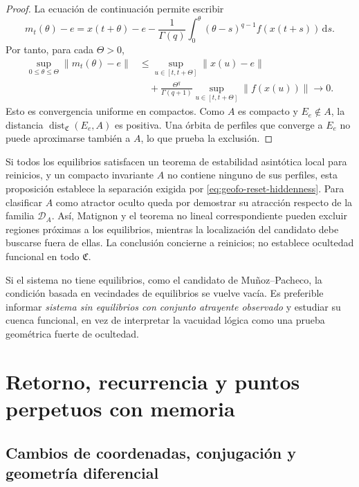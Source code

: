 \begin{proof}
La ecuación de continuación permite escribir
\[
 m_t(\theta)-e=x(t+\theta)-e
 -\frac1{\Gamma(q)}\int_0^\theta
   (\theta-s)^{q-1}f(x(t+s))\,\mathrm ds.
\]
Por tanto, para cada \(\Theta>0\),
\begin{align*}
 \sup_{0\leq\theta\leq\Theta}\|m_t(\theta)-e\|
 &\leq\sup_{u\in[t,t+\Theta]}\|x(u)-e\|\\
 &\quad+\frac{\Theta^q}{\Gamma(q+1)}
       \sup_{u\in[t,t+\Theta]}\|f(x(u))\|
 \longrightarrow0.
\end{align*}
Esto es convergencia uniforme en compactos. Como \(A\) es compacto y
\(E_e\notin A\), la distancia
\(\operatorname{dist}_{\mathfrak C}(E_e,A)\) es positiva.
Una órbita de perfiles que converge a \(E_e\) no puede aproximarse también
a \(A\), lo que prueba la exclusión.
\end{proof}

Si todos los equilibrios satisfacen un teorema de estabilidad asintótica local
para reinicios, y un compacto invariante \(A\) no contiene ninguno de sus
perfiles, esta proposición establece la separación exigida por
\cref{eq:geofo-reset-hiddenness}. Para clasificar \(A\) como atractor
oculto queda por demostrar su atracción respecto de la familia
\(\mathcal D_A\). Así, Matignon y el teorema no lineal correspondiente
pueden excluir regiones próximas a los equilibrios, mientras la localización
del candidato debe buscarse fuera de ellas. La conclusión concierne a
reinicios; no establece ocultedad funcional en todo \(\mathfrak C\).

Si el sistema no tiene equilibrios, como el candidato de Muñoz--Pacheco, la
condición basada en vecindades de equilibrios se vuelve vacía. Es preferible
informar \emph{sistema sin equilibrios con conjunto atrayente observado} y
estudiar su cuenca funcional, en vez de interpretar la vacuidad lógica como
una prueba geométrica fuerte de ocultedad.

\fi

\ifnum{}\relax
\ifdefined\HAFOCaputoBlockSelect
\section{Retorno, recurrencia y puntos perpetuos con memoria}
\fi
\subsection{Cambios de coordenadas, conjugación y geometría diferencial}

